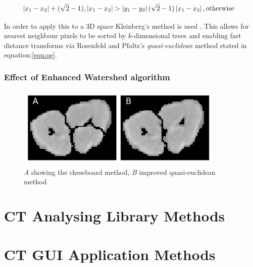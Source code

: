 \documentclass[11pt]{report}
\begin{document}
\begin{equation}
\label{eqn:qe}
\left | x_1 - x_2 \right | + (\sqrt{2}-1), \left | x_1 - x_2 \right | >\left | y_1 - y_2 \right | (\sqrt{2}-1) \left | x_1 - x_2 \right | ,\textup{otherwise}
\end{equation}


In order to apply this to a 3D space Kleinberg's method is used  \cite{Kleinberg1997}. This allows for nearest neighbour pixels to be sorted by $k$-dimensional trees
and enabling fast distance transforms via Rosenfeld and Pfaltz's \emph{quasi-euclidean} method stated in equation:\ref{eqn:qe}.
\subsubsection{Effect of Enhanced Watershed algorithm}
\label{sec-3-2-1-2}
\begin{center}
\begin{figure}[htb]
\centering
\includegraphics[width=10cm]{./images/chess_quasi.png}
\caption{\label{fig:qe}\emph{A} showing the chessboard method, \emph{B} improved quasi-euclidean method}
\end{figure}
\end{center}

\section{CT Analysing Library Methods}
\label{sec-3-3}
\section{CT GUI Application Methods}
\label{sec-3-4}
\end{document}
